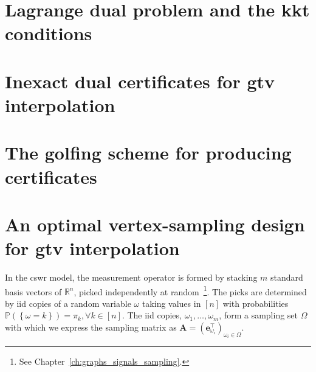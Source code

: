 \section{Lagrange dual problem and the \texorpdfstring{\acrshort{kkt}}{KKT} conditions}



\section{Inexact dual certificates for \texorpdfstring{\acrshort{gtv}}{G-TV} interpolation}\label{sec:inexact_dc}



\section{The golfing scheme for producing certificates}



\section{An optimal vertex-sampling design for \texorpdfstring{\acrshort{gtv}}{G-TV} interpolation}

In the \acrshort{cswr} model, the measurement operator is formed by stacking $m$ standard basis vectors of $\mathbb{R}^{n}$, picked independently at random~\footnote{See Chapter~\ref{ch:graphs_signals_sampling}.}. The picks are determined by \acrshort{iid} copies of a random variable $\omega$ taking values in $[n]$ with probabilities $\mathbb{P} \left ( \left \{  \omega = k \right \}\right ) = \pi_k, \forall k \in [n]$. The \acrshort{iid} copies, $\omega_1, \dots, \omega_m$, form a sampling set $\Omega$ with which we express the sampling matrix as $\mathbf{A} = \left(\mathbf{e}_{\omega_i}^\top\right)_{\omega_i \in \Omega}$.

